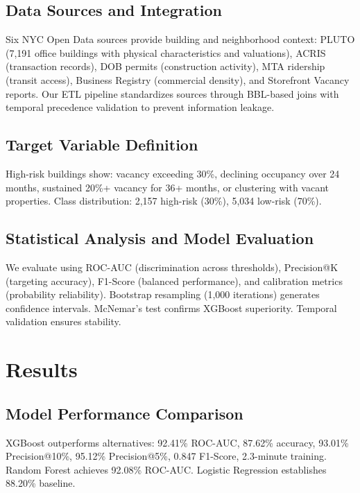 \documentclass[12pt,letterpaper]{article}
\begin{document}
\subsection*{Data Sources and Integration}

Six NYC Open Data sources provide building and neighborhood context: PLUTO (7,191 office buildings with physical characteristics and valuations), ACRIS (transaction records), DOB permits (construction activity), MTA ridership (transit access), Business Registry (commercial density), and Storefront Vacancy reports. Our ETL pipeline standardizes sources through BBL-based joins with temporal precedence validation to prevent information leakage.

\subsection*{Target Variable Definition}

High-risk buildings show: vacancy exceeding 30\%, declining occupancy over 24 months, sustained 20\%+ vacancy for 36+ months, or clustering with vacant properties. Class distribution: 2,157 high-risk (30\%), 5,034 low-risk (70\%).

\subsection*{Statistical Analysis and Model Evaluation}

We evaluate using ROC-AUC (discrimination across thresholds), Precision@K (targeting accuracy), F1-Score (balanced performance), and calibration metrics (probability reliability). Bootstrap resampling (1,000 iterations) generates confidence intervals. McNemar's test confirms XGBoost superiority. Temporal validation ensures stability.

\section*{Results}

\subsection*{Model Performance Comparison}

XGBoost outperforms alternatives: 92.41\% ROC-AUC, 87.62\% accuracy, 93.01\% Precision@10\%, 95.12\% Precision@5\%, 0.847 F1-Score, 2.3-minute training. Random Forest achieves 92.08\% ROC-AUC. Logistic Regression establishes 88.20\% baseline.
\end{document}

